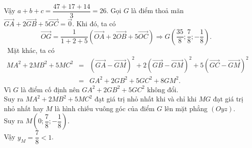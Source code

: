\begin{ex}
{\begin{itemchoice}
			Vậy $a+b+c=\dfrac{47+17+14}{3}=26$.
			\itemch Gọi $G$ là điểm thoả mãn $\overrightarrow{GA}+2\overrightarrow{GB}+5\overrightarrow{GC}=\overrightarrow{0}$. Khi đó, ta có
			$$\overrightarrow{OG}=\dfrac{1}{1+2+5}\left(\overrightarrow{OA}+2\overrightarrow{OB}+5\overrightarrow{OC}\right)\Rightarrow G\left(\dfrac{35}{8};\dfrac{7}{8};-\dfrac{1}{8}\right).$$\
			Mặt khác, ta có 
			\begin{eqnarray*}
				MA^2+2MB^2+5MC^2&=&\left(\overrightarrow{GA}-\overrightarrow{GM}\right)^2+2\left(\overrightarrow{GB}-\overrightarrow{GM}\right)^2+5\left(\overrightarrow{GC}-\overrightarrow{GM}\right)^2\\
				&=&GA^2+2GB^2+5GC^2+8GM^2.
			\end{eqnarray*}
			Vì $G$ là điểm cố định nên $GA^2+2GB^2+5GC^2$ không đổi.\\
			Suy ra $MA^2+2MB^2+5MC^2$ đạt giá trị nhỏ nhất khi và chỉ khi $MG$ đạt giá trị nhỏ nhất hay $M$ là hình chiếu vuông góc của điểm $G$ lên mặt phẳng $(Oyz)$.\\
			Suy ra $ M\left(0;\dfrac{7}{8};-\dfrac{1}{8}\right)$.\\
			Vậy $y_M=\dfrac{7}{8}<1$.
		\end{itemchoice}
	}
\end{ex}

